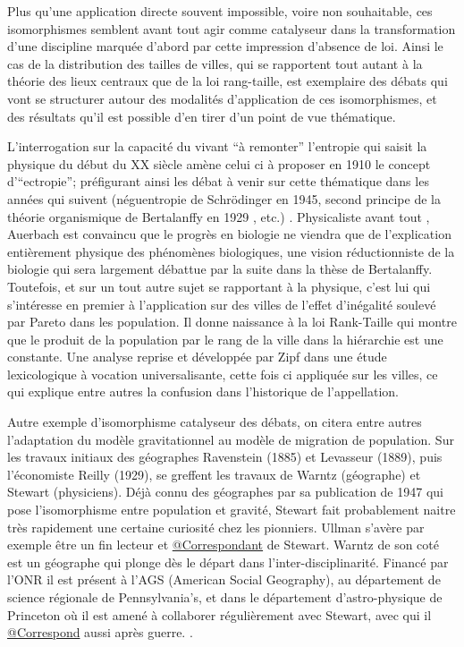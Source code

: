 Plus qu'une application directe souvent impossible, voire non souhaitable, ces isomorphismes semblent avant tout agir comme catalyseur dans la transformation d'une discipline marquée d'abord par cette impression d'absence de loi. Ainsi le cas de la distribution des tailles de villes, qui se rapportent tout autant à la théorie des lieux centraux que de la loi rang-taille, est exemplaire des débats qui vont se structurer autour des modalités d'application de ces isomorphismes, et des résultats qu'il est possible d'en tirer d'un point de vue thématique.

L'interrogation sur la capacité du vivant \enquote{à remonter} l'entropie qui saisit la physique du début du XX siècle amène celui ci à proposer en 1910 le concept d'\enquote{ectropie}; préfigurant ainsi les débat à venir sur cette thématique dans les années qui suivent (néguentropie de Schrödinger en 1945, second principe de la théorie organismique de Bertalanffy en 1929 \autocite[475]{Pouvreau2013}, etc.) \autocite[80]{Pouvreau2013}. Physicaliste avant tout \autocite[87]{Pouvreau2013}, Auerbach est convaincu que le progrès en biologie ne viendra que de l'explication entièrement physique des phénomènes biologiques, une vision réductionniste de la biologie qui sera largement débattue par la suite dans la thèse de Bertalanffy. Toutefois, et sur un tout autre sujet se rapportant à la physique, c'est lui qui s’intéresse en premier à l'application sur des villes de l'effet d'inégalité soulevé par Pareto dans les population.\autocite{Auerbach1913} Il donne naissance à la loi Rank-Taille qui montre que le produit de la population par le rang de la ville dans la hiérarchie est une constante. Une analyse reprise et développée par Zipf dans une étude lexicologique à vocation universalisante, cette fois ci appliquée sur les villes, ce qui explique entre autres la confusion dans l’historique de l’appellation.

Autre exemple d'isomorphisme catalyseur des débats, on citera entre autres l'adaptation du modèle gravitationnel au modèle de migration de population. Sur les travaux initiaux des géographes Ravenstein (1885) et Levasseur (1889), puis l'économiste Reilly (1929), se greffent les travaux de Warntz (géographe) et Stewart (physiciens). Déjà connu des géographes par sa publication de 1947 qui pose l'isomorphisme entre population et gravité, Stewart fait probablement naitre très rapidement une certaine curiosité chez les pionniers. Ullman s'avère par exemple être un fin lecteur \autocite[61]{Glick1988} et \href{http://nwda.orbiscascade.org/ark:/80444/xv01385}{@Correspondant} de Stewart. Warntz de son coté est un géographe qui plonge dès le départ dans l'inter-disciplinarité. Financé par l'ONR il est présent à l'AGS (American Social Geography), au département de science régionale de Pennsylvania's, et dans le département d'astro-physique de Princeton où il est amené à collaborer régulièrement avec Stewart, avec qui il \href{http://rmc.library.cornell.edu/EAD/htmldocs/RMM04392.html}{@Correspond} aussi après guerre. \autocite{Barnes2006a}.

